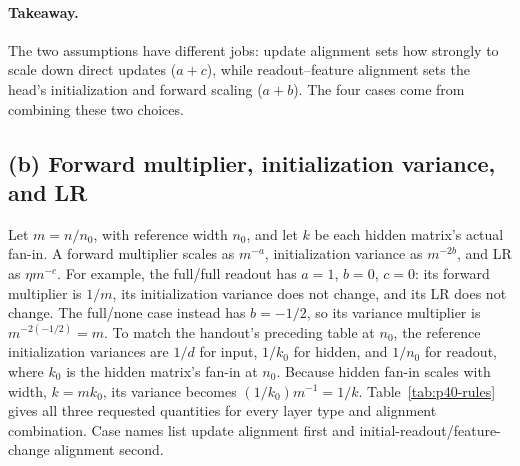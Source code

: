 \documentclass{article}
\begin{document}
\paragraph{Takeaway.} The two assumptions have different jobs: update
alignment sets how strongly to scale down direct updates ($a+c$), while
readout--feature alignment sets the head's initialization and forward
scaling ($a+b$). The four cases come from combining these two choices.

\subsection{(b) Forward multiplier, initialization variance, and LR}

Let $m=n/n_0$, with reference width $n_0$, and let $k$ be each hidden
matrix's actual fan-in. A forward multiplier scales as $m^{-a}$,
initialization variance as $m^{-2b}$, and LR as $\eta m^{-c}$.
For example, the full/full readout has $a=1$, $b=0$, $c=0$:
its forward multiplier is $1/m$, its initialization variance does not change,
and its LR does not change. The full/none case instead has $b=-1/2$,
so its variance multiplier is $m^{-2(-1/2)}=m$.
To match the handout's preceding table at $n_0$, the reference
initialization variances are $1/d$ for input, $1/k_0$ for hidden, and
$1/n_0$ for readout, where $k_0$ is the hidden matrix's fan-in at $n_0$.
Because hidden fan-in scales with width, $k=mk_0$, its variance becomes
$(1/k_0)m^{-1}=1/k$.
Table~\ref{tab:p40-rules} gives all three requested quantities for
every layer type and alignment combination. Case names list update
alignment first and initial-readout/feature-change alignment second.
\end{document}
